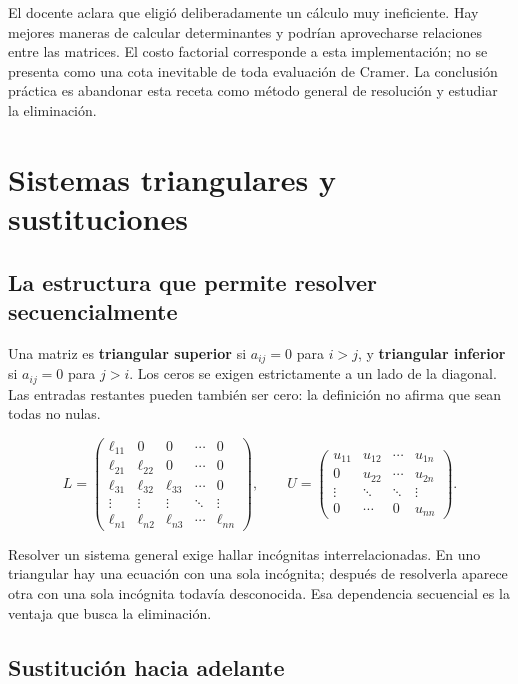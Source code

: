 \documentclass[12pt,a4paper]{article}
\begin{document}
El docente aclara que eligió deliberadamente un cálculo muy ineficiente. Hay mejores maneras de calcular determinantes y podrían aprovecharse relaciones entre las matrices. El costo factorial corresponde a esta implementación; no se presenta como una cota inevitable de toda evaluación de Cramer. La conclusión práctica es abandonar esta receta como método general de resolución y estudiar la eliminación.

\section{Sistemas triangulares y sustituciones}

\subsection{La estructura que permite resolver secuencialmente}

Una matriz es \textbf{triangular superior} si $a_{ij}=0$ para $i>j$, y \textbf{triangular inferior} si $a_{ij}=0$ para $j>i$. Los ceros se exigen estrictamente a un lado de la diagonal. Las entradas restantes pueden también ser cero: la definición no afirma que sean todas no nulas.

\[
L=\begin{pmatrix}
\ell_{11}&0&0&\cdots&0\\
\ell_{21}&\ell_{22}&0&\cdots&0\\
\ell_{31}&\ell_{32}&\ell_{33}&\cdots&0\\
\vdots&\vdots&\vdots&\ddots&\vdots\\
\ell_{n1}&\ell_{n2}&\ell_{n3}&\cdots&\ell_{nn}
\end{pmatrix},\qquad
U=\begin{pmatrix}
u_{11}&u_{12}&\cdots&u_{1n}\\
0&u_{22}&\cdots&u_{2n}\\
\vdots&\ddots&\ddots&\vdots\\
0&\cdots&0&u_{nn}
\end{pmatrix}.
\]

Resolver un sistema general exige hallar incógnitas interrelacionadas. En uno triangular hay una ecuación con una sola incógnita; después de resolverla aparece otra con una sola incógnita todavía desconocida. Esa dependencia secuencial es la ventaja que busca la eliminación.

\subsection{Sustitución hacia adelante}
\end{document}
